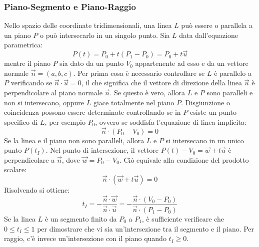 \subsubsection{Piano-Segmento e Piano-Raggio}
Nello spazio delle coordinate tridimensionali, una linea $L$ può essere o parallela a un piano $P$ o può intersecarlo in un singolo punto. Sia $L$ data dall'equazione parametrica:
\begin{equation}
P(t) = P_0 + t(P_1-P_0) = P_0 + t\vec{u}
\end{equation}
mentre il piano $P$ sia dato da un punto $V_0$ appartenente ad esso e da un vettore normale $\vec{n} = (a,b,c)$. Per prima cosa è necessario controllare se $L$ è parallelo a $P$ verificando se $\vec{n}\cdot\vec{u} = 0$, il che significa che il vettore di direzione della linea $\vec{u}$ è perpendicolare al piano normale $\vec{n}$. Se questo è vero, allora $L$ e $P$ sono paralleli e non si intersecano, oppure $L$ giace totalmente nel piano $P$. Disgiunzione o coincidenza possono essere determinate controllando se in $P$ esiste un punto specifico di $L$, per esempio $P_0$, ovvero se soddisfa l'equazione di linea implicita:
\begin{equation}
\vec{n} \cdot (P_0-V_0) = 0
\end{equation}
Se la linea e il piano non sono paralleli, allora $L$ e $P$ si intersecano in un unico punto $P(t_I)$. Nel punto di intersezione, il vettore $P(t)-V_0 = \vec{w} + t\vec{u}$ è perpendicolare a $\vec{n}$, dove $\vec{w} = P_0-V_0$. Ciò equivale alla condizione del prodotto scalare:
\begin{equation}
\vec{n} \cdot (\vec{w}+t\vec{u}) = 0
\end{equation}
Risolvendo si ottiene:
\begin{equation}
t_I = -\frac{\vec{n}\cdot\vec{w}}{\vec{n}\cdot\vec{u}}
=
-\frac{\vec{n}\cdot(V_0-P_0)}{\vec{n}\cdot(P_1-P_0)}
\end{equation}
Se la linea $L$ è un segmento finito da $P_0$ a $P_1$, è sufficiente verificare che $0 \leq t_I \leq 1$ per dimostrare che vi sia un'intersezione tra il segmento e il piano. Per raggio, c'è invece un'intersezione con il piano quando $t_I \geq 0$.

